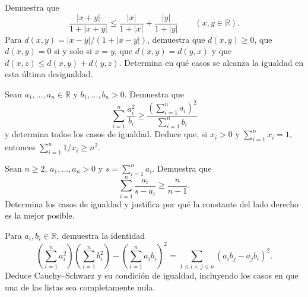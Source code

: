 \begin{samepage}
\begin{problem}\label{prob:reto-absoluto-02}
Demuestra que
\[
\frac{|x+y|}{1+|x+y|}
\le\frac{|x|}{1+|x|}+\frac{|y|}{1+|y|}
\qquad(x,y\in\mathbb R).
\]
Para $d(x,y)=|x-y|/(1+|x-y|)$, demuestra que $d(x,y)\ge0$, que $d(x,y)=0$ si y solo si $x=y$, que $d(x,y)=d(y,x)$ y que $d(x,z)\le d(x,y)+d(y,z)$. Determina en qué casos se alcanza la igualdad en esta última desigualdad.~\cite{mseOrdenIneq}
\end{problem}
\end{samepage}
\par{}

\begin{samepage}
\begin{problem}\label{prob:reto-absoluto-03}
Sean $a_1,\ldots,a_n\in\mathbb R$ y $b_1,\ldots,b_n>0$. Demuestra que
\[
\sum_{i=1}^n\frac{a_i^2}{b_i}
\ge\frac{\left(\sum_{i=1}^n a_i\right)^2}{\sum_{i=1}^n b_i}
\]
y determina todos los casos de igualdad. Deduce que, si $x_i>0$ y $\sum_{i=1}^n x_i=1$, entonces $\sum_{i=1}^n1/x_i\ge n^2$.
\end{problem}
\end{samepage}
\par{}

\begin{samepage}
\begin{problem}\label{prob:reto-absoluto-04}
Sean $n\ge2$, $a_1,\ldots,a_n>0$ y $s=\sum_{i=1}^n a_i$. Demuestra que
\[
\sum_{i=1}^n\frac{a_i}{s-a_i}\ge\frac{n}{n-1}.
\]
Determina los casos de igualdad y justifica por qué la constante del lado derecho es la mejor posible.~\cite{mseNesbitt}
\end{problem}
\end{samepage}
\par{}

\begin{samepage}
\begin{problem}\label{prob:reto-absoluto-05}
Para $a_i,b_i\in\mathbb R$, demuestra la identidad
\[
\left(\sum_{i=1}^n a_i^2\right)\left(\sum_{i=1}^n b_i^2\right)
-\left(\sum_{i=1}^n a_i b_i\right)^2
=\sum_{1\le i<j\le n}(a_i b_j-a_j b_i)^2.
\]
Deduce Cauchy--Schwarz y su condición de igualdad, incluyendo los casos en que una de las listas sea completamente nula.~\cite{mseLagrange}
\end{problem}
\end{samepage}
\par{}

